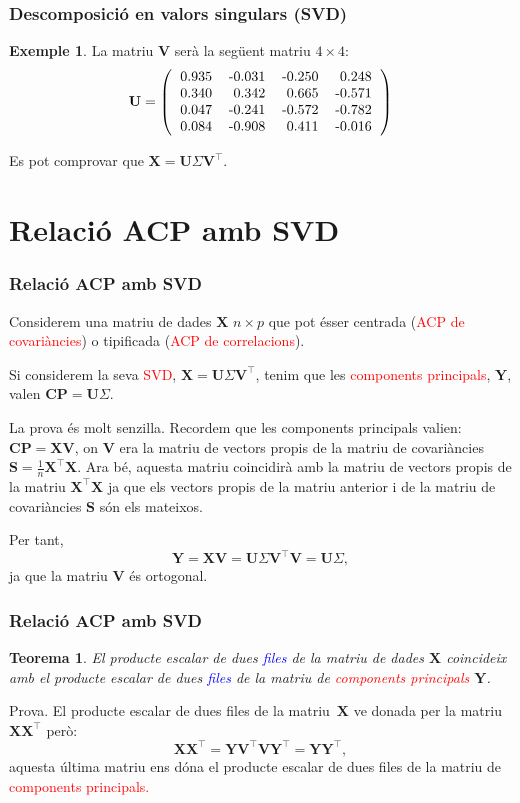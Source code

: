\documentclass[12pt,t]{beamer}
\newcommand{\red}[1]{\textcolor{red}{#1}}
\newcommand{\blue}[1]{\textcolor{blue}{#1}}
\theoremstyle{plain}
\newtheorem{teorema}{Teorema}
\theoremstyle{definition}
\newtheorem{exemple}{Exemple}
\begin{document}
\begin{frame}
\frametitle{Descomposició en valors singulars (SVD)}
\begin{exemple}
La matriu $\mathbf{V}$ serà la següent matriu $4\times 4$:
\[
\mathbf{U} =\left(
\begin{tabular}{rrrr}
  0.935 & -0.031 & -0.250 & 0.248 \\ 
  0.340 & 0.342 & 0.665 & -0.571 \\ 
  0.047 & -0.241 & -0.572 & -0.782 \\ 
  0.084 & -0.908 & 0.411 & -0.016 \\ 
  \end{tabular}\right)
\]

Es pot comprovar que $\mathbf{X}=\mathbf{U}\Sigma\mathbf{V}^\top$.
\end{exemple}
\end{frame}

\section{Relació  ACP amb SVD}

\begin{frame}
\frametitle{Relació ACP amb SVD}
Considerem una matriu de dades $\mathbf{X}$ $n\times p$ que pot ésser centrada (\red{ACP de covariàncies}) o tipificada 
(\red{ACP de correlacions}).
\medskip

Si considerem la seva \red{SVD}, $\mathbf{X}=\mathbf{U}\Sigma\mathbf{V}^\top$, tenim que les \red{components 
principals}, $\mathbf{Y}$, valen $\mathbf{CP}=\mathbf{U}\Sigma$.
\medskip

{\footnotesize
La prova és molt senzilla. Recordem que les components principals valien: $\mathbf{CP}=\mathbf{X}\mathbf{V}$, on 
$\mathbf{V}$ era la matriu de vectors propis de la matriu de covariàncies 
$\mathbf{S}=\frac{1}{n}\mathbf{X}^\top\mathbf{X}$. Ara bé, aquesta matriu coincidirà amb la matriu de vectors propis de 
la matriu $\mathbf{X}^\top\mathbf{X}$ ja que els vectors propis de la matriu anterior i de la matriu de covariàncies 
$\mathbf{S}$ són els mateixos.

Per tant, 
$$\mathbf{Y}=\mathbf{X}\mathbf{V}=\mathbf{U}\Sigma\mathbf{V}^\top\mathbf{V}=\mathbf{U}\Sigma,$$
ja que la matriu $\mathbf{V}$ és ortogonal.}
\end{frame}

\begin{frame}
\frametitle{Relació ACP amb SVD}
\begin{teorema}
El producte escalar de dues \blue{files} de la matriu de dades $\mathbf{X}$ coincideix amb el producte escalar de dues 
\blue{files} de la matriu de  \red{components principals} $\mathbf{Y}$.
\end{teorema}
{\footnotesize
Prova. El producte escalar de dues files de la matriu~$\mathbf{X}$ ve donada per la matriu $\mathbf{X}\mathbf{X}^\top$ 
però:
\[
\mathbf{X}\mathbf{X}^\top = \mathbf{Y}\mathbf{V}^\top\mathbf{V}\mathbf{Y}^\top =\mathbf{Y}\mathbf{Y}^\top,
\]
aquesta última matriu ens dóna el producte escalar de dues files de la matriu de \red{components principals.}
}
\end{frame}
\end{document}
